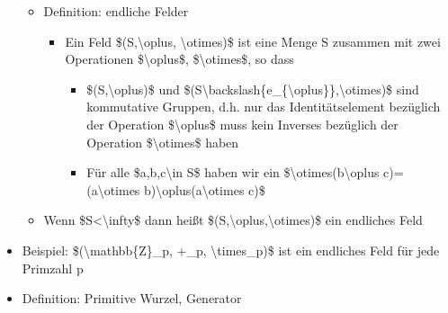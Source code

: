 \documentclass[a4paper]{article}
\begin{document}
\begin{multicols}{3}
\begin{itemize}
              \begin{itemize}
                  \item
                        Definition: endliche Felder

                        \begin{itemize}
                            \item
                                  Ein Feld \$(S,\textbackslash oplus, \textbackslash otimes)\$ ist
                                  eine Menge S zusammen mit zwei Operationen
                                  \$\textbackslash oplus\$, \$\textbackslash otimes\$, so dass

                                  \begin{itemize}
                                      \item
                                            \$(S,\textbackslash oplus)\$ und
                                            \$(S\textbackslash backslash\{e\_\{\textbackslash oplus\}\},\textbackslash otimes)\$
                                            sind kommutative Gruppen, d.h. nur das Identitätselement
                                            bezüglich der Operation \$\textbackslash oplus\$ muss kein
                                            Inverses bezüglich der Operation \$\textbackslash otimes\$ haben
                                      \item
                                            Für alle \$a,b,c\textbackslash in S\$ haben wir ein
                                            \$\textbackslash otimes(b\textbackslash oplus
                                            c)=(a\textbackslash otimes
                                            b)\textbackslash oplus(a\textbackslash otimes c)\$
                                  \end{itemize}
                        \end{itemize}
                  \item
                        Wenn \$\textbar S\textbar\textless\textbackslash infty\$ dann heißt
                        \$(S,\textbackslash oplus,\textbackslash otimes)\$ ein endliches
                        Feld
              \end{itemize}
        \item
              Beispiel: \$(\textbackslash mathbb\{Z\}\_p, +\_p,
              \textbackslash times\_p)\$ ist ein endliches Feld für jede Primzahl p
        \item
              Definition: Primitive Wurzel, Generator


\end{itemize}
\end{multicols}
\end{document}
